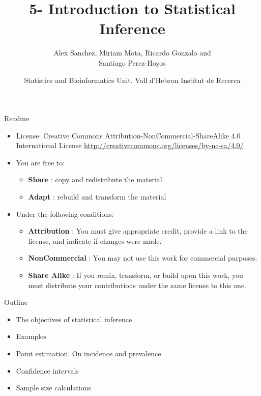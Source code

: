 \documentclass[
  ignorenonframetext,
]{beamer}
\title{5- Introduction to Statistical Inference}
\author{Alex Sanchez, Miriam Mota, Ricardo Gonzalo and\\
Santiago Perez-Hoyos}
\date{Statistics and Bioinformatics Unit. Vall d'Hebron Institut de
Recerca}
\providecommand{\tightlist}{%
  \setlength{\itemsep}{0pt}\setlength{\parskip}{0pt}}
\begin{document}
\frame{\titlepage}

\begin{frame}
\begin{block}{Readme}
\protect\hypertarget{readme}{}
\begin{itemize}
\item
  License: Creative Commons Attribution-NonCommercial-ShareAlike 4.0
  International License
  \url{http://creativecommons.org/licenses/by-nc-sa/4.0/}
\item
  You are free to:

  \begin{itemize}
  \tightlist
  \item
    \textbf{Share} : copy and redistribute the material
  \item
    \textbf{Adapt} : rebuild and transform the material
  \end{itemize}
\item
  Under the following conditions:

  \begin{itemize}
  \tightlist
  \item
    \textbf{Attribution} : You must give appropriate credit, provide a
    link to the license, and indicate if changes were made.
  \item
    \textbf{NonCommercial} : You may not use this work for commercial
    purposes.
  \item
    \textbf{Share Alike} : If you remix, transform, or build upon this
    work, you must distribute your contributions under the same license
    to this one.
  \end{itemize}
\end{itemize}
\end{block}
\end{frame}

\begin{frame}{Outline}
\protect\hypertarget{outline}{}
\begin{itemize}
\tightlist
\item
  The objectives of statistical inference
\item
  Examples
\item
  Point estimation. On incidence and prevalence
\item
  Confidence intervals
\item
  Sample size calculations
\end{itemize}
\end{frame}
\end{document}
